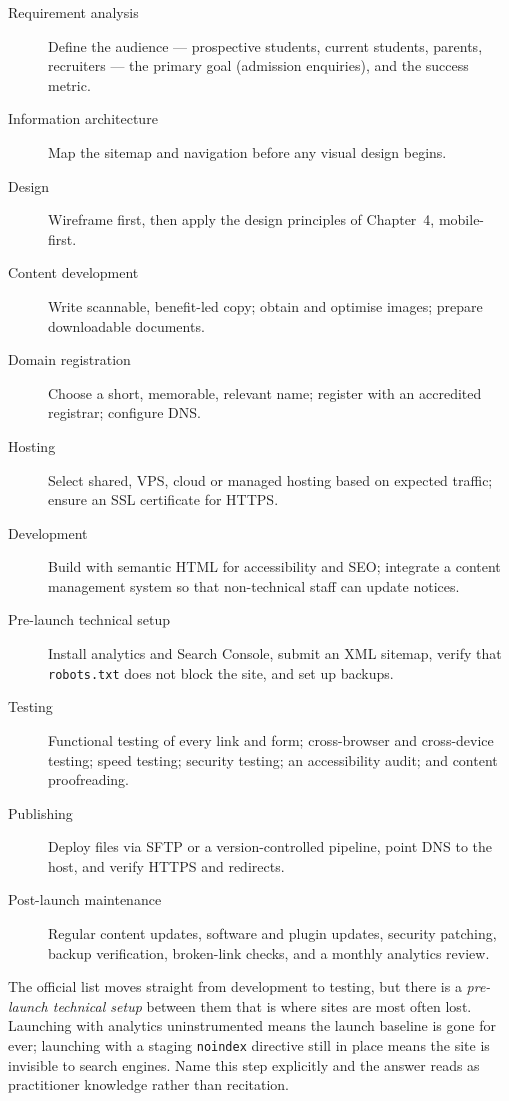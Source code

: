 \documentclass{MMTextbook}
\begin{document}
\begin{description}
\item[Requirement analysis] Define the audience --- prospective students, current
students, parents, recruiters --- the primary goal (admission enquiries), and the
success metric.
\item[Information architecture] Map the sitemap and navigation before any visual
design begins.
\item[Design] Wireframe first, then apply the design principles of Chapter~4,
mobile-first.
\item[Content development] Write scannable, benefit-led copy; obtain and optimise
images; prepare downloadable documents.
\item[Domain registration] Choose a short, memorable, relevant name; register with
an accredited registrar; configure DNS.
\item[Hosting] Select shared, VPS, cloud or managed hosting based on expected
traffic; ensure an SSL certificate for HTTPS.
\item[Development] Build with semantic HTML for accessibility and SEO; integrate a
content management system so that non-technical staff can update notices.
\item[Pre-launch technical setup] Install analytics and Search Console, submit an
XML sitemap, verify that \texttt{robots.txt} does not block the site, and set up
backups.
\item[Testing] Functional testing of every link and form; cross-browser and
cross-device testing; speed testing; security testing; an accessibility audit;
and content proofreading.
\item[Publishing] Deploy files via SFTP or a version-controlled pipeline, point
DNS to the host, and verify HTTPS and redirects.
\item[Post-launch maintenance] Regular content updates, software and plugin
updates, security patching, backup verification, broken-link checks, and a monthly
analytics review.
\end{description}

\begin{warnbox}
The official list moves straight from development to testing, but there is a
\emph{pre-launch technical setup} between them that is where sites are most often
lost. Launching with analytics uninstrumented means the launch baseline is gone
for ever; launching with a staging \texttt{noindex} directive still in place means
the site is invisible to search engines. Name this step explicitly and the answer
reads as practitioner knowledge rather than recitation.
\end{warnbox}
\end{document}
